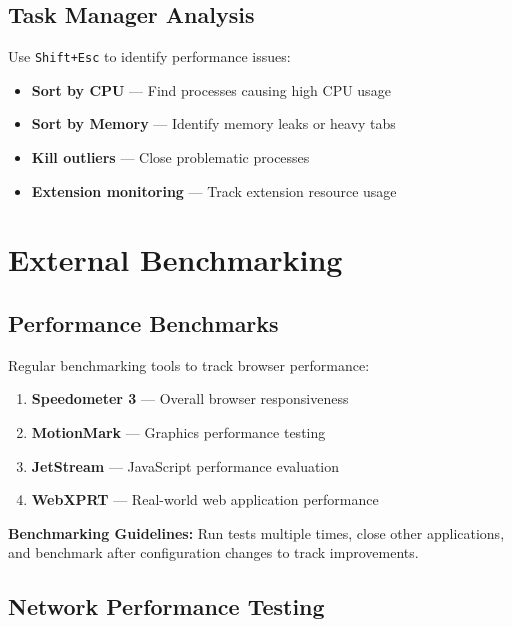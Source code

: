 \documentclass[11pt,a4paper,oneside]{book}
\newcommand{\keystroke}[1]{\texttt{\color{primaryblue}#1}}
\begin{document}
\subsection{Task Manager Analysis}

Use \keystroke{Shift+Esc} to identify performance issues:

\begin{itemize}
    \item \textbf{Sort by CPU} — Find processes causing high CPU usage
    \item \textbf{Sort by Memory} — Identify memory leaks or heavy tabs
    \item \textbf{Kill outliers} — Close problematic processes
    \item \textbf{Extension monitoring} — Track extension resource usage
\end{itemize}

\section{External Benchmarking}

\subsection{Performance Benchmarks}

Regular benchmarking tools to track browser performance:

\begin{enumerate}
    \item \textbf{Speedometer 3} — Overall browser responsiveness
    \item \textbf{MotionMark} — Graphics performance testing
    \item \textbf{JetStream} — JavaScript performance evaluation
    \item \textbf{WebXPRT} — Real-world web application performance
\end{enumerate}

\begin{tipbox}
\textbf{Benchmarking Guidelines:} Run tests multiple times, close other applications, and benchmark after configuration changes to track improvements.
\end{tipbox}

\subsection{Network Performance Testing}
\end{document}
